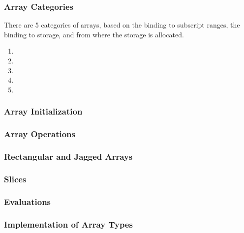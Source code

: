 \subsubsection{Array Categories}\label{subsubsec:Arrays-Categories}
There are 5 categories of arrays, based on the binding to subscript ranges, the binding to storage, and from where the storage is allocated.
\begin{enumerate}[noitemsep]
\item {}
\item {}
\item {}
\item {}
\item {}
\end{enumerate}

\subsubsection{Array Initialization}\label{subsubsec:Arrays-Initialization}
\subsubsection{Array Operations}\label{subsubsec:Arrays-Operations}
\subsubsection{Rectangular and Jagged Arrays}\label{subsubsec:Arrays-Rectangular_Jagged}
\subsubsection{Slices}\label{subsubsec:Arrays-Slices}
\subsubsection{Evaluations}\label{subsubsec:Arrays-Evaluations}
\subsubsection{Implementation of Array Types}\label{subsubsec:Arrays-Implementation}

